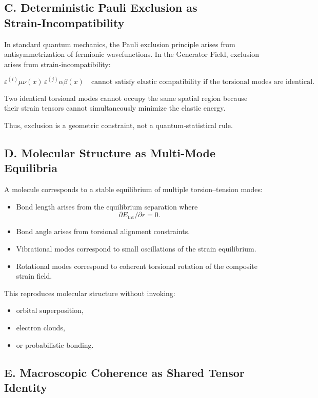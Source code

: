 \documentclass[reprint,amsmath,amssymb,aps,prl,floatfix]{revtex4-2}
\begin{document}
\begin{itemize}
\subsection{C. Deterministic Pauli Exclusion as Strain‑Incompatibility}

In standard quantum mechanics, the Pauli exclusion principle arises from antisymmetrization of fermionic wavefunctions.  
In the Generator Field, exclusion arises from strain‑incompatibility:

\[
\varepsilon^{(i)}{\mu\nu}(x)\,\varepsilon^{(j)}{\alpha\beta}(x)
\quad\text{cannot satisfy elastic compatibility if the torsional modes are identical}.
\]

Two identical torsional modes cannot occupy the same spatial region because their strain tensors cannot simultaneously minimize the elastic energy.

Thus, exclusion is a geometric constraint, not a quantum‑statistical rule.

\subsection{D. Molecular Structure as Multi‑Mode Equilibria}

A molecule corresponds to a stable equilibrium of multiple torsion–tension modes:
\begin{itemize}
\item Bond length arises from the equilibrium separation where  
  \[
  \partial E_{\mathrm{tot}}/\partial r = 0.
  \]

\item Bond angle arises from torsional alignment constraints.

\item Vibrational modes correspond to small oscillations of the strain equilibrium.

\item Rotational modes correspond to coherent torsional rotation of the composite strain field.
\end{itemize}
\medskip
This reproduces molecular structure without invoking:
\begin{itemize}
\item orbital superposition,  
\item electron clouds,  
\item or probabilistic bonding.
\end{itemize}

\subsection{E. Macroscopic Coherence as Shared Tensor Identity}


\end{itemize}
\end{document}
